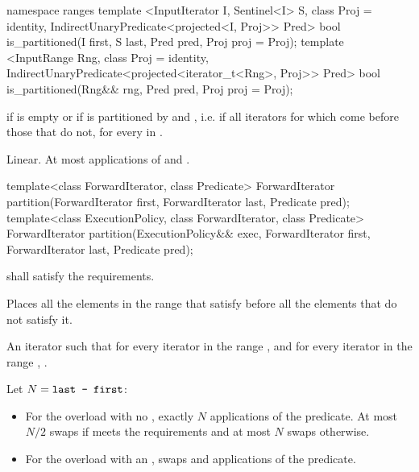 \begin{addedblock}
%
\begin{itemdecl}
namespace ranges {
  template <InputIterator I, Sentinel<I> S, class Proj = identity,
            IndirectUnaryPredicate<projected<I, Proj>> Pred>
    bool is_partitioned(I first, S last, Pred pred, Proj proj = Proj{});
  template <InputRange Rng, class Proj = identity,
            IndirectUnaryPredicate<projected<iterator_t<Rng>, Proj>> Pred>
    bool is_partitioned(Rng&& rng, Pred pred, Proj proj = Proj{});
}
\end{itemdecl}

\begin{itemdescr}
\pnum
\returns {} if
 is empty or if
 is partitioned by  and , i.e. if all
iterators  for which
 come before those that do not,
for every  in .

\pnum
\complexity Linear. At most  applications of  and .
\end{itemdescr}
\end{addedblock}

%
\begin{itemdecl}
template<class ForwardIterator, class Predicate>
  ForwardIterator
    partition(ForwardIterator first, ForwardIterator last, Predicate pred);
template<class ExecutionPolicy, class ForwardIterator, class Predicate>
  ForwardIterator
    partition(ExecutionPolicy&& exec,
              ForwardIterator first, ForwardIterator last, Predicate pred);
\end{itemdecl}

\begin{itemdescr}
\pnum
\requires
{} shall satisfy the
 requirements.

\pnum
\effects Places all the elements in the range  that satisfy  before all the elements that do not satisfy it.

\pnum
\returns An iterator  such that for every iterator  in the range
 , and for every iterator  in the
range , .

\pnum
\complexity Let $N = \texttt{last - first}$:
\begin{itemize}
\item For the overload with no , exactly $N$ applications
of the predicate.  At most $N / 2$ swaps if  meets the
 requirements and at most $N$ swaps otherwise.
\item For the overload with an ,
 swaps and  applications of the predicate.
\end{itemize}
\end{itemdescr}

